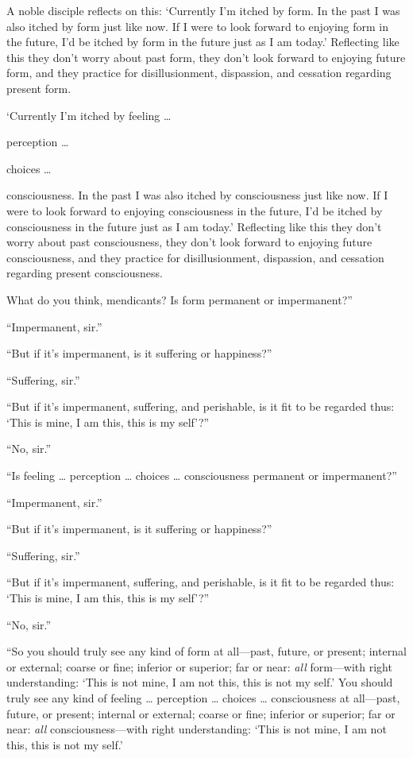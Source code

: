 \documentclass[12pt,openany]{book}%
\begin{document}
A noble disciple reflects on this: ‘Currently I’m itched by form. In the past I was also itched by form just like now. If I were to look forward to enjoying form in the future, I’d be itched by form in the future just as I am today.’ Reflecting like this they don’t worry about past form, they don’t look forward to enjoying future form, and they practice for disillusionment, dispassion, and cessation regarding present form. 

‘Currently I’m itched by feeling … 

perception … 

choices … 

consciousness. In the past I was also itched by consciousness just like now. If I were to look forward to enjoying consciousness in the future, I’d be itched by consciousness in the future just as I am today.’ Reflecting like this they don’t worry about past consciousness, they don’t look forward to enjoying future consciousness, and they practice for disillusionment, dispassion, and cessation regarding present consciousness. 

What do you think, mendicants? Is form permanent or impermanent?” 

“Impermanent, sir.” 

“But if it’s impermanent, is it suffering or happiness?” 

“Suffering, sir.” 

“But if it’s impermanent, suffering, and perishable, is it fit to be regarded thus: ‘This is mine, I am this, this is my self’?” 

“No, sir.” 

“Is feeling … perception … choices … consciousness permanent or impermanent?” 

“Impermanent, sir.” 

“But if it’s impermanent, is it suffering or happiness?” 

“Suffering, sir.” 

“But if it’s impermanent, suffering, and perishable, is it fit to be regarded thus: ‘This is mine, I am this, this is my self’?” 

“No, sir.” 

“So you should truly see any kind of form at all—past, future, or present; internal or external; coarse or fine; inferior or superior; far or near: \emph{all} form—with right understanding: ‘This is not mine, I am not this, this is not my self.’ You should truly see any kind of feeling … perception … choices … consciousness at all—past, future, or present; internal or external; coarse or fine; inferior or superior; far or near: \emph{all} consciousness—with right understanding: ‘This is not mine, I am not this, this is not my self.’ 
\end{document}
